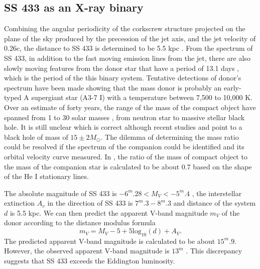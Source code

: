 \subsection{SS 433 as an X-ray binary} 
Combining the angular periodicity of the corkscrew structure projected on the plane of the sky produced by the precession of the jet axis, and the jet velocity of 0.26c, the distance to SS 433 is determined to be 5.5 kpc \citep{Blundell2004}. 
From the spectrum of SS 433, in addition to the fast moving emission lines from the jet, there are also slowly moving features from the donor star that have a period of 13.1 days \citep{Crampton1980}, which is the period of the this binary system. Tentative detections of donor's spectrum have been made \citep{Hillwig2004} showing that the mass donor is probably an early-typed A supergiant star (A3-7 I) with a temperature between 7,500 to 10,000 K. Over an estimate of forty years, the range of the mass of the compact object have spanned from 1 to 30 solar masses \citep{Bowler2018}, from neutron star to massive stellar black hole. It is still unclear which is correct although recent studies \cite{Lopez2006} and \cite{Bowler2018} point to a black hole of mass of $15 \pm 2 M_{\odot}$. The dilemma of determining the mass ratio could be resolved if the spectrum of the companion could be identified and its orbital velocity curve measured. In \cite{Bowler2018}, the ratio of the mass of compact object to the mass of the companion star is calculated to be about 0.7 based on the shape of the He I stationary lines. \par

The absolute magnitude of SS 433 is $-6^m.28 < M_V < -5^m.4$ \citep{Goranskij2011}, the interstellar extinction $A_v$ in the direction of SS 433 is $7^m.3 - 8^m.3$ \citep{Cherepashchuk1982} and distance of the system $d$ is 5.5 kpc. We can then predict the apparent V-band magnitude $m_V$ of the donor according to the distance modulus formula
\begin{equation}
    m_V = M_V - 5 + 5\mathrm{log}_{10}(d) + A_V.
\end{equation}
The predicted apparent V-band magnitude is calculated to be about $15^m.9$. However, the observed apparent V-band magnitude is $13^m$ \citep{Cherepashchuk1982}. This discrepancy suggests that SS 433 exceeds the Eddington luminosity.\par


